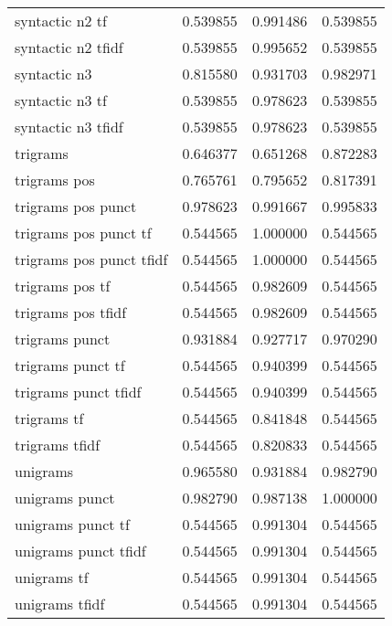 \documentclass{article}
\begin{document}
\begin{table}
\begin{tabular}{lrrr}
syntactic n2 tf           &  0.539855 &       0.991486 &             0.539855 \\
syntactic n2 tfidf        &  0.539855 &       0.995652 &             0.539855 \\
syntactic n3              &  0.815580 &       0.931703 &             0.982971 \\
syntactic n3 tf           &  0.539855 &       0.978623 &             0.539855 \\
syntactic n3 tfidf        &  0.539855 &       0.978623 &             0.539855 \\
trigrams                   &  0.646377 &       0.651268 &             0.872283 \\
trigrams pos               &  0.765761 &       0.795652 &             0.817391 \\
trigrams pos punct         &  0.978623 &       0.991667 &             0.995833 \\
trigrams pos punct tf      &  0.544565 &       1.000000 &             0.544565 \\
trigrams pos punct tfidf   &  0.544565 &       1.000000 &             0.544565 \\
trigrams pos tf            &  0.544565 &       0.982609 &             0.544565 \\
trigrams pos tfidf         &  0.544565 &       0.982609 &             0.544565 \\
trigrams punct             &  0.931884 &       0.927717 &             0.970290 \\
trigrams punct tf          &  0.544565 &       0.940399 &             0.544565 \\
trigrams punct tfidf       &  0.544565 &       0.940399 &             0.544565 \\
trigrams tf                &  0.544565 &       0.841848 &             0.544565 \\
trigrams tfidf             &  0.544565 &       0.820833 &             0.544565 \\
unigrams                   &  0.965580 &       0.931884 &             0.982790 \\
unigrams punct             &  0.982790 &       0.987138 &             1.000000 \\
unigrams punct tf          &  0.544565 &       0.991304 &             0.544565 \\
unigrams punct tfidf       &  0.544565 &       0.991304 &             0.544565 \\
unigrams tf                &  0.544565 &       0.991304 &             0.544565 \\
unigrams tfidf             &  0.544565 &       0.991304 &             0.544565 \\
\bottomrule
\end{tabular}
\end{table}
\end{document}
